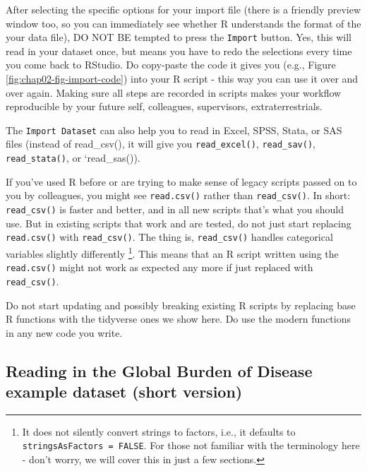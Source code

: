 \documentclass[12pt,]{krantz}
\renewenvironment{quote}{\begin{VF}}{\end{VF}}
\theoremstyle{definition}
\theoremstyle{definition}
\theoremstyle{definition}
\theoremstyle{remark}
\begin{document}
After selecting the specific options for your import file (there is a
friendly preview window too, so you can immediately see whether R
understands the format of the your data file), DO NOT BE tempted to
press the \texttt{Import} button. Yes, this will read in your dataset
once, but means you have to redo the selections every time you come back
to RStudio. Do copy-paste the code it gives you (e.g., Figure
\ref{fig:chap02-fig-import-code}) into your R script - this way you can
use it over and over again. Making sure all steps are recorded in
scripts makes your workflow reproducible by your future self,
colleagues, supervisors, extraterrestrials.

\begin{quote}
The \texttt{Import\ Dataset} can also help you to read in Excel, SPSS,
Stata, or SAS files (instead of read\_csv(), it will give you
\texttt{read\_excel()}, \texttt{read\_sav()}, \texttt{read\_stata()}, or
`read\_sas()).
\end{quote}

If you've used R before or are trying to make sense of legacy scripts
passed on to you by colleagues, you might see \texttt{read.csv()} rather
than \texttt{read\_csv()}. In short: \texttt{read\_csv()} is faster and
better, and in all new scripts that's what you should use. But in
existing scripts that work and are tested, do not just start replacing
\texttt{read.csv()} with \texttt{read\_csv()}. The thing is,
\texttt{read\_csv()} handles categorical variables slightly differently
\footnote{It does not silently convert strings to factors, i.e., it
  defaults to \texttt{stringsAsFactors\ =\ FALSE}. For those not
  familiar with the terminology here - don't worry, we will cover this
  in just a few sections.}. This means that an R script written using
the \texttt{read.csv()} might not work as expected any more if just
replaced with \texttt{read\_csv()}.

\begin{quote}
Do not start updating and possibly breaking existing R scripts by
replacing base R functions with the tidyverse ones we show here. Do use
the modern functions in any new code you write.
\end{quote}

\hypertarget{reading-in-the-global-burden-of-disease-example-dataset-short-version}{%
\subsection{Reading in the Global Burden of Disease example dataset
(short
version)}\label{reading-in-the-global-burden-of-disease-example-dataset-short-version}}
\end{document}
